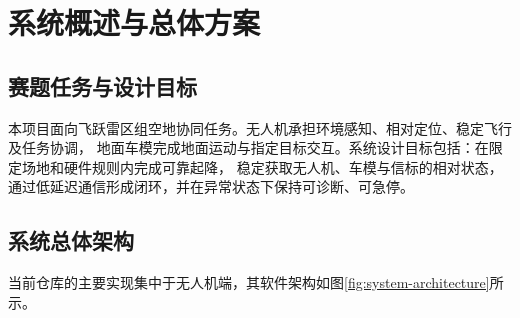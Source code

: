 \chapter{系统概述与总体方案}

\section{赛题任务与设计目标}

本项目面向飞跃雷区组空地协同任务。无人机承担环境感知、相对定位、稳定飞行及任务协调，
地面车模完成地面运动与指定目标交互。系统设计目标包括：在限定场地和硬件规则内完成可靠起降，
稳定获取无人机、车模与信标的相对状态，通过低延迟通信形成闭环，并在异常状态下保持可诊断、可急停。


\section{系统总体架构}

当前仓库的主要实现集中于无人机端，其软件架构如图\ref{fig:system-architecture}所示。

